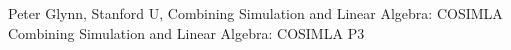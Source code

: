 {}	%
{}		%
{Peter Glynn, Stanford U, Combining Simulation and Linear Algebra: COSIMLA}	%
{Combining Simulation and Linear Algebra: COSIMLA}		%
{P3}		%
\\\hline

